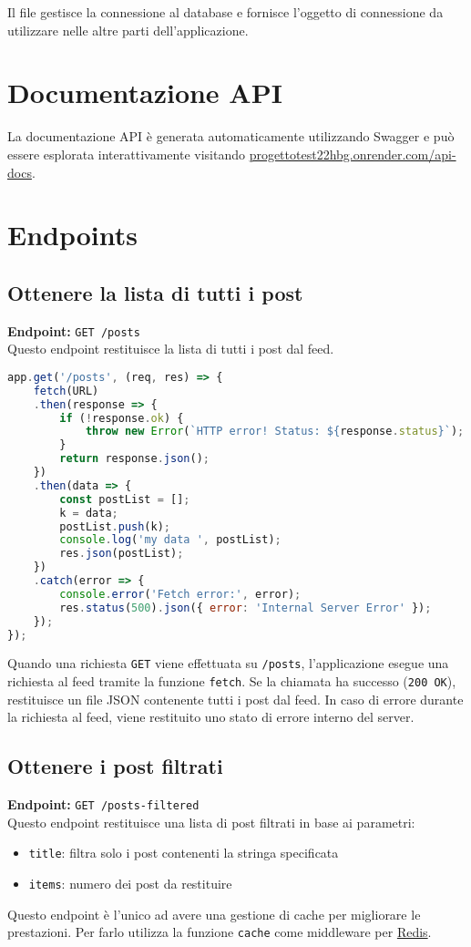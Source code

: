\documentclass{article}
\begin{document}
Il file gestisce la connessione al database e fornisce l'oggetto di connessione da utilizzare nelle altre parti dell'applicazione.


\section{Documentazione API}
La documentazione API è generata automaticamente utilizzando Swagger e può essere esplorata interattivamente visitando \href{https://progettotest22hbg.onrender.com/api-docs}{progettotest22hbg.onrender.com/api-docs}.

\section{Endpoints}
\subsection{Ottenere la lista di tutti i post}
\textbf{Endpoint:} \texttt{GET /posts}\\
Questo endpoint restituisce la lista di tutti i post dal feed.

\begin{lstlisting}[language=JavaScript, caption={Implementazione dell'endpoint per ottenere la lista di tutti i post}, label={lst:getPostsEndpoint}]
app.get('/posts', (req, res) => {
    fetch(URL)
    .then(response => {
        if (!response.ok) {
            throw new Error(`HTTP error! Status: ${response.status}`);
        }
        return response.json();
    })
    .then(data => {
        const postList = [];
        k = data;
        postList.push(k);
        console.log('my data ', postList);
        res.json(postList);
    })
    .catch(error => {
        console.error('Fetch error:', error);
        res.status(500).json({ error: 'Internal Server Error' });
    });
});
\end{lstlisting}

Quando una richiesta \texttt{GET} viene effettuata su \texttt{/posts}, l'applicazione esegue una richiesta al feed tramite la funzione \texttt{fetch}.
Se la chiamata ha successo (\texttt{200 OK}), restituisce un file JSON contenente tutti i post dal feed.
In caso di errore durante la richiesta al feed, viene restituito uno stato di errore interno del server.

\subsection{Ottenere i post filtrati}
\textbf{Endpoint:} \texttt{GET /posts-filtered}\\
Questo endpoint restituisce una lista di post filtrati in base ai parametri:
\begin{itemize}
  \item \texttt{title}: filtra solo i post contenenti la stringa specificata
  \item \texttt{items}: numero dei post da restituire
\end{itemize}
Questo endpoint è l'unico ad avere una gestione di cache per migliorare le prestazioni. Per farlo utilizza la funzione \texttt{cache} come middleware per \href{https://www.npmjs.com/package/redis}{Redis}.
\end{document}
